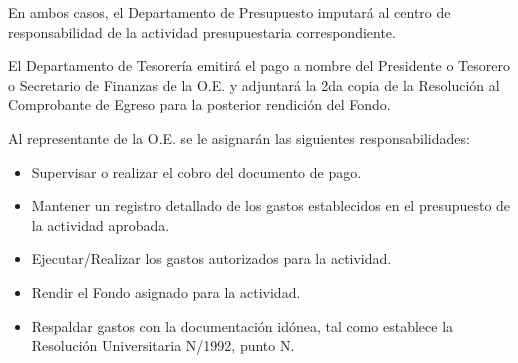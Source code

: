En ambos casos, el Departamento de Presupuesto imputará al centro de responsabilidad de la actividad presupuestaria correspondiente.

El Departamento de Tesorería emitirá el pago a nombre del Presidente o Tesorero o Secretario de Finanzas de la O.E. y adjuntará la 2da copia de la Resolución al Comprobante de Egreso para la posterior rendición del Fondo.

Al representante de la O.E. se le asignarán las siguientes responsabilidades:

\begin{itemize}
	\item Supervisar o realizar el cobro del documento de pago.
	\item Mantener un registro detallado de los gastos establecidos en el presupuesto de la actividad aprobada.
	\item Ejecutar/Realizar los gastos autorizados para la actividad.
	\item Rendir el Fondo asignado para la actividad.
	\item Respaldar gastos con la documentación idónea, tal como establece la Resolución Universitaria N/1992, punto N. 
\end{itemize} 

